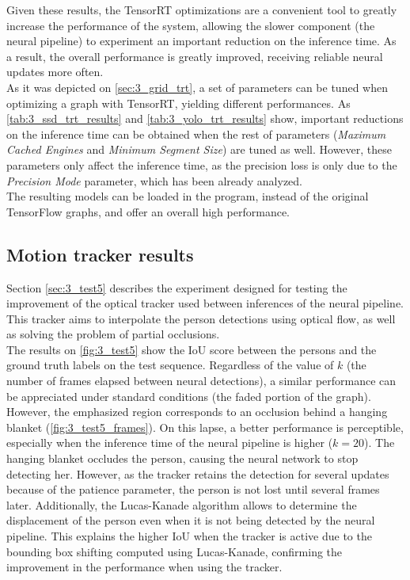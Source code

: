 Given these results, the TensorRT optimizations are a convenient tool to greatly increase the performance of the system, allowing the slower component (the neural pipeline) to experiment an important reduction on the inference time. As a result, the overall performance is greatly improved, receiving reliable neural updates more often.\\

As it was depicted on \autoref{sec:3_grid_trt}, a set of parameters can be tuned when optimizing a graph with TensorRT, yielding different performances. As \autoref{tab:3_ssd_trt_results} and \autoref{tab:3_yolo_trt_results} show, important reductions on the inference time can be obtained when the rest of parameters (\textit{Maximum Cached Engines} and \textit{Minimum Segment Size}) are tuned as well. However, these parameters only affect the inference time, as the precision loss is only due to the \textit{Precision Mode} parameter, which has been already analyzed.\\

The resulting models can be loaded in the program, instead of the original TensorFlow graphs, and offer an overall high performance.

\subsection{Motion tracker results}

Section \ref{sec:3_test5} describes the experiment designed for testing the improvement of the optical tracker used between inferences of the neural pipeline. This tracker aims to interpolate the person detections using optical flow, as well as solving the problem of partial occlusions.\\

The results on \autoref{fig:3_test5} show the IoU score between the persons and the ground truth labels on the test sequence. Regardless of the value of $k$ (the number of frames elapsed between neural detections), a similar performance can be appreciated under standard conditions (the faded portion of the graph). However, the emphasized region corresponds to an occlusion behind a hanging blanket (\autoref{fig:3_test5_frames}). On this lapse, a better performance is perceptible, especially when the inference time of the neural pipeline is higher ($k=20$). The hanging blanket occludes the person, causing the neural network to stop detecting her. However, as the tracker retains the detection for several updates because of the patience parameter, the person is not lost until several frames later. Additionally, the Lucas-Kanade algorithm allows to determine the displacement of the person even when it is not being detected by the neural pipeline. This explains the higher IoU when the tracker is active due to the bounding box shifting computed using Lucas-Kanade, confirming the improvement in the performance when using the tracker.\\

